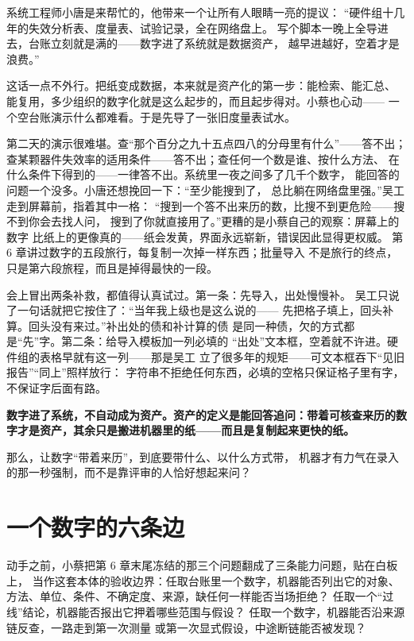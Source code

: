 系统工程师小唐是来帮忙的，他带来一个让所有人眼睛一亮的提议：
“硬件组十几年的失效分析表、度量表、试验记录，全在网络盘上。
写个脚本一晚上全导进去，台账立刻就是满的——数字进了系统就是数据资产，
越早进越好，空着才是浪费。”

这话一点不外行。把纸变成数据，本来就是资产化的第一步：能检索、能汇总、
能复用，多少组织的数字化就是这么起步的，而且起步得对。小蔡也心动——
一个空台账演示什么都难看。于是先导了一张旧度量表试水。

第二天的演示很难堪。查“那个百分之九十五点四八的分母里有什么”——答不出；
查某颗器件失效率的适用条件——答不出；查任何一个数是谁、按什么方法、
在什么条件下得到的——一律答不出。系统里一夜之间多了几千个数字，
能回答的问题一个没多。小唐还想挽回一下：“至少能搜到了，
总比躺在网络盘里强。”吴工走到屏幕前，指着其中一格：
“搜到一个答不出来历的数，比搜不到更危险——搜不到你会去找人问，
搜到了你就直接用了。”更糟的是小蔡自己的观察：屏幕上的数字
比纸上的更像真的——纸会发黄，界面永远崭新，错误因此显得更权威。
第 6 章讲过数字的五段旅行，每复制一次掉一样东西；批量导入
不是旅行的终点，只是第六段旅程，而且是掉得最快的一段。

会上冒出两条补救，都值得认真试过。第一条：先导入，出处慢慢补。
吴工只说了一句话就把它按住了：“当年我上级也是这么说的——
先把格子填上，回头补算。回头没有来过。”补出处的债和补计算的债
是同一种债，欠的方式都是“先”字。第二条：给导入模板加一列必填的
“出处”文本框，空着就不许进。硬件组的表格早就有这一列——那是吴工
立了很多年的规矩——可文本框吞下“见旧报告”“同上”照样放行：
字符串不拒绝任何东西，必填的空格只保证格子里有字，不保证字后面有路。

\textbf{数字进了系统，不自动成为资产。资产的定义是能回答追问：带着可核查来历的数字才是资产，其余只是搬进机器里的纸——而且是复制起来更快的纸。}

那么，让数字“带着来历”，到底要带什么、以什么方式带，
机器才有力气在录入的那一秒强制，而不是靠评审的人恰好想起来问？

\section{一个数字的六条边}

动手之前，小蔡把第 6 章末尾冻结的那三个问题翻成了三条能力问题，贴在白板上，
当作这套本体的验收边界：任取台账里一个数字，机器能否列出它的对象、
方法、单位、条件、不确定度、来源，缺任何一样能否当场拒绝？
任取一个“过线”结论，机器能否报出它押着哪些范围与假设？
任取一个数字，机器能否沿来源链反查，一路走到第一次测量
或第一次显式假设，中途断链能否被发现？

